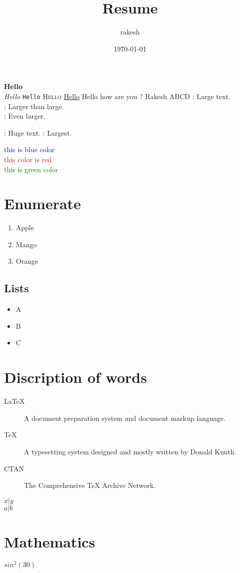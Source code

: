 \documentclass{article}
\author{rakesh}
\date{\today}
\title{Resume}
\begin{document}
	\maketitle
	\textbf{Hello}  \space \\
	\textit{Hello }
	\texttt{Hello}
	\textsc{Hello}
	\underline{Hello}
	\tiny{ Hello }
	\huge{	how are you ?}
	\scriptsize{Rakesh}
	\footnotesize{ABCD}
	\large:{ Large text.} \\
	\Large: {Larger than large.} \\
	\LARGE:{ Even larger.}
	
	\huge: {Huge text.}
	\Huge: {Largest.}
	
	\textcolor{blue}{\huge {this is blue color}} \\
	\textcolor{red}{this color is red} \\
	\textcolor{green}{this is green color} \\
	\section{Enumerate}
		\begin{enumerate}
			\item  Apple
			\item Mango
			\item Orange
		\end{enumerate}
	\subsection{Lists}
		\begin{itemize}
			\item A
			\item B
			\item C
		\end{itemize}
	\section{Discription of words}
	\begin{description}
		\item[LaTeX] A document preparation system and document
		markup language.
		\item[TeX] A typesetting system designed and mostly written
		by Donald Knuth.
		\vspace{1cm}
		\item[CTAN] \hspace{1cm} The Comprehensive TeX Archive Network. 
	\end{description}

	$x \vert y$ \\
	$a \vert b$
	\section{Mathematics}
	\begin{math}
		sin^2(30)
		\end{math}
\end{document}
